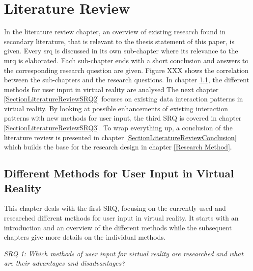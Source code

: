 
\chapter{Literature Review} %

\label{ChapterLiteratureReview} %

In the literature review chapter, an overview of existing research found in secondary literature, that is relevant to the thesis statement of this paper, is given. Every \gls{srq} is discussed in its own sub-chapter where its relevance to the \gls{mrq} is elaborated. Each sub-chapter ends with a short conclusion and answers to the corresponding research question are given.
Figure XXX shows the correlation between the sub-chapters and the research questions. In chapter \ref{SectionLiteratureReviewSRQ1}, the different methods for user input in virtual reality are analysed The next chapter \ref{SectionLiteratureReviewSRQ2} focuses on existing data interaction patterns in virtual reality. By looking at possible enhancements of existing interaction patterns with new methods for user input, the third SRQ is covered in chapter \ref{SectionLiteratureReviewSRQ3}. To wrap everything up, a conclusion of the literature review is presented in chapter \ref{SectionLiteratureReviewConclusion} which builds the base for the research design in chapter \ref{Research Method}.




\section{Different Methods for User Input in Virtual Reality}

\label{SectionLiteratureReviewSRQ1}

This chapter deals with the first SRQ, focusing on the currently used and researched different methods for user input in virtual reality. It starts with an introduction and an overview of the different methods while the subsequent chapters give more details on the individual methods.
\begin{framed}
	\textit{SRQ 1: Which methods of user input for virtual reality are researched and what are their advantages and disadvantages?}
\end{framed}

